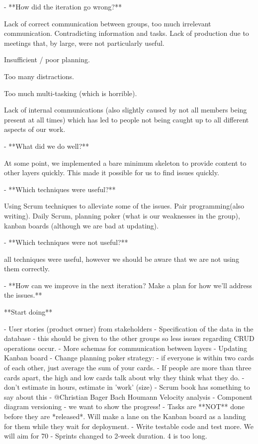 - **How did the iteration go wrong?**
    
    Lack of correct communication between groups, too much irrelevant communication. Contradicting information and tasks. Lack of production due to meetings that, by large, were not particularly useful. 
    
    Insufficient / poor planning.
    
    Too many distractions.
    
    Too much multi-tasking (which is horrible).
    
    Lack of internal communications (also slightly caused by not all members being present at all times) which has led to people not being caught up to all different aspects of our work.
    
- **What did we do well?**
    
    At some point, we implemented a bare minimum skeleton to provide content to other layers quickly. This made it possible for us to find issues quickly.
    
- **Which techniques were useful?**
    
    Using Scrum techniques to alleviate some of the issues. Pair programming(also writing). Daily Scrum, planning poker (what is our weaknesses in the group), kanban boards (although we are bad at updating).
    
- **Which techniques were not useful?**
    
    all techniques were useful, however we should be aware that we are not using them correctly. 
    
- **How can we improve in the next iteration? Make a plan for how we'll address the issues.**
    
    **Start doing**
    
    - User stories (product owner) from stakeholders
    - Specification of the data in the database - this should be given to the other groups so less issues regarding CRUD operations occur.
    - More schemas for communication between layers
    - Updating Kanban board
    - Change planning poker strategy:
        - if everyone is within two cards of each other, just average the sum of your cards.
        - If people are more than three cards apart, the high and low cards talk about why they think what they do.
        - don't estimate in hours, estimate in 'work' (size) - Scrum book has something to say about this
    - @Christian Bager Bach Houmann Velocity analysis
    - Component diagram versioning - we want to show the progress!
    - Tasks are **NOT** done before they are *released*. Will make a lane on the Kanban board as a landing for them while they wait for deployment.
    - Write testable code and test more. We will aim for 70%
    - Sprints changed to 2-week duration. 4 is too long.
    
